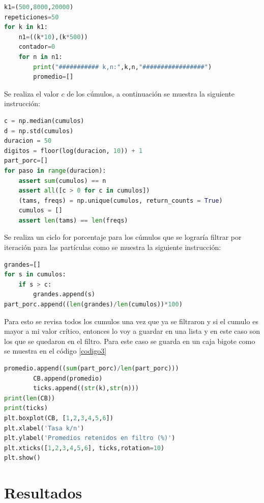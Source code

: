 \documentclass{article}
\begin{document}
\begin{lstlisting}[caption=Generamos los ciclos para variar $n/k$, label=codigo2, language=Python]
k1=(500,8000,20000)
repeticiones=50
for k in k1:
    n1=((k*10),(k*500))
    contador=0
    for n in n1:
        print("########### k,n:",k,n,"#################")
        promedio=[]
\end{lstlisting}

Se realiza el valor $c$ de los cúmulos, a continuación se muestra la siguiente instrucción:
\begin{lstlisting}[caption=Generamos valor $c$, label=codigo2, language=Python]
c = np.median(cumulos) 
d = np.std(cumulos) 
duracion = 50
digitos = floor(log(duracion, 10)) + 1
part_porc=[]
for paso in range(duracion):
    assert sum(cumulos) == n
    assert all([c > 0 for c in cumulos]) 
    (tams, freqs) = np.unique(cumulos, return_counts = True)
    cumulos = []
    assert len(tams) == len(freqs)
\end{lstlisting}

Se realiza un ciclo for porcentaje para los cúmulos que se lograría filtrar por iteración para las partículas como se muestra la siguiente instrucción:

\begin{lstlisting}[caption=Ciclo for para porcentaje de las partículas, label=codigo3, language=Python]
grandes=[]
for s in cumulos:
    if s > c:
        grandes.append(s)
part_porc.append((len(grandes)/len(cumulos))*100)
\end{lstlisting}

Para esto se revisa todos los cumulos una vez que ya se filtraron y si el cumulo es mayor a mi valor crítico, entonces lo voy a guardar en una lista y en este caso son los que se quedaron en el filtro. Para este caso se guarda en un caja bigote como se muestra en el código \ref{codigo3} 

\begin{lstlisting}[caption=Promedio, label=codigo3, language=Python]
promedio.append((sum(part_porc)/len(part_porc)))
        CB.append(promedio)
        ticks.append((str(k),str(n)))
print(len(CB))
print(ticks)
plt.boxplot(CB, [1,2,3,4,5,6])
plt.xlabel('Tasa k/n')
plt.ylabel('Promedios retenidos en filtro (%)')
plt.xticks([1,2,3,4,5,6], ticks,rotation=10)
plt.show()
\end{lstlisting}

\section{Resultados}\label{res}
\end{document}
